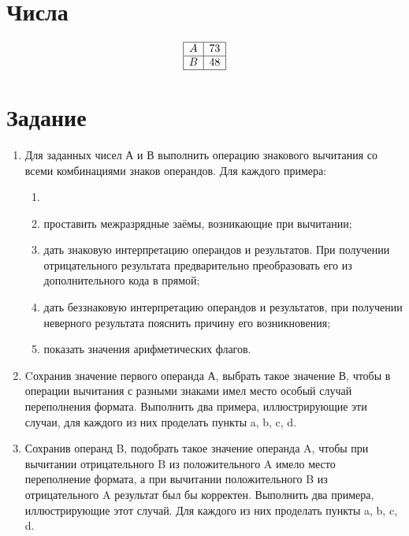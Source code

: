 \documentclass{article}
\begin{document}
\itmo[
  variant=111,
  labn=3,
  worktype=Домашняя работа,
  discipline=Дискретная математика,
  group=P3115,
  student=Владимир Мацюк,
  teacher=Поляков Владимир Иванович,
  logo=../../../lib/img/itmo.png
]

\section{Числа}
$$
  \begin{array}{|c|c|}
    \hline
    A & 73 \\\hline
    B & 48 \\\hline
  \end{array}
$$
\section{Задание}
\begin{enumerate}
  \item Для заданных чисел А и В выполнить операцию знакового вычитания со всеми комбинациями знаков операндов. Для каждого примера:
        \begin{enumerate}
          \item
          \item проставить межразрядные заёмы, возникающие при вычитании;
          \item дать знаковую интерпретацию операндов и результатов. При получении отрицательного результата предварительно преобразовать его из дополнительного кода в прямой;
          \item дать беззнаковую интерпретацию операндов и результатов, при получении неверного результата пояснить причину его возникновения;
          \item показать значения арифметических флагов.
        \end{enumerate}
  \item Cохранив значение первого операнда А, выбрать такое значение В, чтобы в операции вычитания с разными знаками имел место особый случай переполнения формата. Выполнить два примера, иллюстрирующие эти случаи, для каждого из них проделать пункты a, b, c, d.
  \item Сохранив операнд B, подобрать такое значение операнда A, чтобы при вычитании отрицательного B из положительного A имело место переполнение формата, а при вычитании положительного B из отрицательного A результат был бы корректен. Выполнить два примера, иллюстрирующие этот случай. Для каждого из них проделать пункты a, b, c, d.
\end{enumerate}
\end{document}
